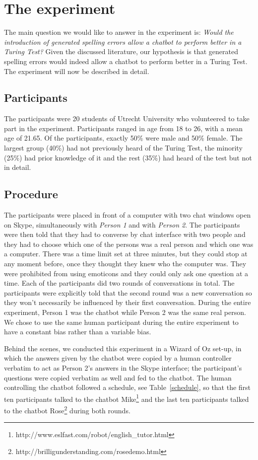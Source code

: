 \section{The experiment}
The main question we would like to answer in the experiment is: \textit{Would the introduction of generated spelling errors allow a chatbot to perform better in a Turing Test?} Given the discussed literature, our hypothesis is that generated spelling errors would indeed allow a chatbot to perform better in a Turing Test. The experiment will now be described in detail.


\subsection{Participants}
The participants were 20 students of Utrecht University who volunteered to take part in the experiment. Participants ranged in age from 18 to 26, with a mean age of 21.65. Of the participants, exactly 50\% were male and 50\% female. The largest group (40\%) had not previously heard of the Turing Test, the minority (25\%) had prior knowledge of it and the rest (35\%) had heard of the test but not in detail.


\subsection{Procedure}
The participants were placed in front of a computer with two chat windows open on Skype, simultaneously with \textit{Person 1} and with \textit{Person 2}. The participants were then told that they had to converse by chat interface with two people and they had to choose which one of the persons was a real person and which one was a computer. There was a time limit set at three minutes, but they could stop at any moment before, once they thought they knew who the computer was. They were prohibited from using emoticons and they could only ask one question at a time. Each of the participants did two rounds of conversations in total. The participants were explicitly told that the second round was a new conversation so they won't necessarily be influenced by their first conversation. During the entire experiment, Person 1 was the chatbot while Person 2 was the same real person. We chose to use the same human participant during the entire experiment to have a constant bias rather than a variable bias.

Behind the scenes, we conducted this experiment in a Wizard of Oz set-up, in which the answers given by the chatbot were copied by a human controller verbatim to act as Person 2's answers in the Skype interface; the participant's questions were copied verbatim as well and fed to the chatbot. The human controlling the chatbot followed a schedule, see Table~\ref{schedule}, so that the first ten participants talked to the chatbot Mike\footnote{http://www.eslfast.com/robot/english\_tutor.html} and the last ten participants talked to the chatbot Rose\footnote{http://brilligunderstanding.com/rosedemo.html} during both rounds.

